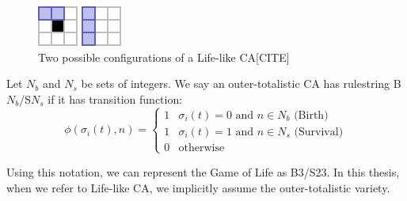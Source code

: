 \begin{figure}[!h]
  \centering
  \begin{minipage}{.4\textwidth}
    \centering
    \includegraphics[width=.4\linewidth]{images/moore_1.png}
  \end{minipage}%
  \begin{minipage}{.4\textwidth}
    \centering
    \includegraphics[width=.4\linewidth]{images/moore_2.png}
  \end{minipage}
  \caption{Two possible configurations of a Life-like CA[CITE]}
  \label{fig:two-moores}
\end{figure}

\begin{definition}
Let $N_b$ and $N_s$ be sets of integers. We say an outer-totalistic CA has rulestring \textnormal{B$N_b$/S$N_s$} if it has transition function:
\[
  \phi(\sigma_i(t), n) = 
  \begin{cases}
    1 & \sigma_i(t) = 0 \text{ and } n \in N_b \text{  (Birth)}\\
    1 & \sigma_i(t) = 1 \text{ and } n \in N_s \text{  (Survival)}\\
    0 & \text{otherwise}
  \end{cases}
\]
\label{def:bs-notation}
\end{definition}

Using this notation, we can represent the Game of Life as B3/S23. In this thesis, when we refer to Life-like CA, we implicitly assume the outer-totalistic variety.


